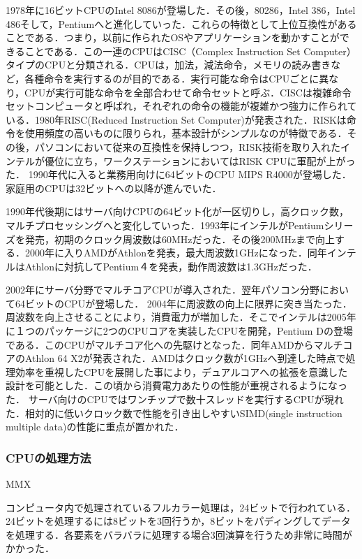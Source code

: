 \documentclass[a4j,12pt]{jsarticle}
\begin{document}
1978年に16ビットCPUのIntel 8086が登場した．その後，80286，Intel 386，Intel 486そして，Pentiumへと進化していった．これらの特徴として上位互換性があることである．つまり，以前に作られたOSやアプリケーションを動かすことができることである．この一連のCPUはCISC（Complex Instruction Set Computer）タイプのCPUと分類される．CPUは，加法，減法命令，メモリの読み書きなど，各種命令を実行するのが目的である．実行可能な命令はCPUごとに異なり，CPUが実行可能な命令を全部合わせて命令セットと呼ぶ．CISCは複雑命令セットコンピュータと呼ばれ，それぞれの命令の機能が複雑かつ強力に作られている．1980年RISC(Reduced Instruction Set Computer)が発表された．RISKは命令を使用頻度の高いものに限りられ，基本設計がシンプルなのが特徴である．その後，パソコンにおいて従来の互換性を保持しつつ，RISK技術を取り入れたインテルが優位に立ち，ワークステーションにおいてはRISK CPUに軍配が上がった．
1990年代に入ると業務用向けに64ビットのCPU MIPS R4000が登場した．家庭用のCPUは32ビットへの以降が進んでいた．

1990年代後期にはサーバ向けCPUの64ビット化が一区切りし，高クロック数，マルチプロセッシングへと変化していった．1993年にインテルがPentiumシリーズを発売，初期のクロック周波数は60MHzだった．その後200MHzまで向上する．2000年に入りAMDがAthlonを発表，最大周波数1GHzになった．同年インテルはAthlonに対抗してPentium４を発表，動作周波数は1.3GHzだった．

2002年にサーバ分野でマルチコアCPUが導入された．翌年パソコン分野において64ビットのCPUが登場した．
2004年に周波数の向上に限界に突き当たった．周波数を向上させることにより，消費電力が増加した．そこでインテルは2005年に１つのパッケージに2つのCPUコアを実装したCPUを開発，Pentium Dの登場である．このCPUがマルチコア化への先駆けとなった．同年AMDからマルチコアのAthlon 64 X2が発表された．AMDはクロック数が1GHzへ到達した時点で処理効率を重視したCPUを展開した事により，デュアルコアへの拡張を意識した設計を可能とした．この頃から消費電力あたりの性能が重視されるようになった．
サーバ向けのCPUではワンチップで数十スレッドを実行するCPUが現れた．相対的に低いクロック数で性能を引き出しやすいSIMD(single instruction multiple data)の性能に重点が置かれた．

\subsubsection{CPUの処理方法}
\begin{Large}
MMX
\end {Large}

コンピュータ内で処理されているフルカラー処理は，24ビットで行われている．24ビットを処理するには8ビットを3回行うか，8ビットをパディングしてデータを処理する．各要素をバラバラに処理する場合3回演算を行うため非常に時間がかかった．
\end{document}

